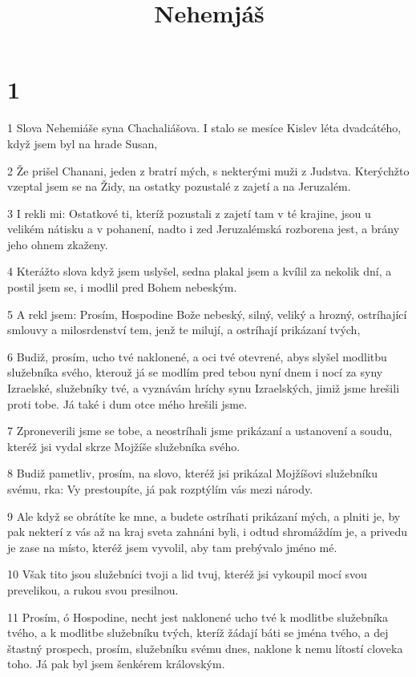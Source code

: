 

\title{Nehemjáš}

\chapter{1}

\par 1 Slova Nehemiáše syna Chachaliášova. I stalo se mesíce Kislev léta dvadcátého, když jsem byl na hrade Susan,
\par 2 Že prišel Chanani, jeden z bratrí mých, s nekterými muži z Judstva. Kterýchžto vzeptal jsem se na Židy, na ostatky pozustalé z zajetí a na Jeruzalém.
\par 3 I rekli mi: Ostatkové ti, kteríž pozustali z zajetí tam v té krajine, jsou u velikém nátisku a v pohanení, nadto i zed Jeruzalémská rozborena jest, a brány jeho ohnem zkaženy.
\par 4 Kterážto slova když jsem uslyšel, sedna plakal jsem a kvílil za nekolik dní, a postil jsem se, i modlil pred Bohem nebeským.
\par 5 A rekl jsem: Prosím, Hospodine Bože nebeský, silný, veliký a hrozný, ostríhající smlouvy a milosrdenství tem, jenž te milují, a ostríhají prikázaní tvých,
\par 6 Budiž, prosím, ucho tvé naklonené, a oci tvé otevrené, abys slyšel modlitbu služebníka svého, kterouž já se modlím pred tebou nyní dnem i nocí za syny Izraelské, služebníky tvé, a vyznávám hríchy synu Izraelských, jimiž jsme hrešili proti tobe. Já také i dum otce mého hrešili jsme.
\par 7 Zproneverili jsme se tobe, a neostríhali jsme prikázaní a ustanovení a soudu, kteréž jsi vydal skrze Mojžíše služebníka svého.
\par 8 Budiž pametliv, prosím, na slovo, kteréž jsi prikázal Mojžíšovi služebníku svému, rka: Vy prestoupíte, já pak rozptýlím vás mezi národy.
\par 9 Ale když se obrátíte ke mne, a budete ostríhati prikázaní mých, a plniti je, by pak nekterí z vás až na kraj sveta zahnáni byli, i odtud shromáždím je, a privedu je zase na místo, kteréž jsem vyvolil, aby tam prebývalo jméno mé.
\par 10 Však tito jsou služebníci tvoji a lid tvuj, kteréž jsi vykoupil mocí svou prevelikou, a rukou svou presilnou.
\par 11 Prosím, ó Hospodine, necht jest naklonené ucho tvé k modlitbe služebníka tvého, a k modlitbe služebníku tvých, kteríž žádají báti se jména tvého, a dej štastný prospech, prosím, služebníku svému dnes, naklone k nemu lítostí cloveka toho. Já pak byl jsem šenkérem královským.

